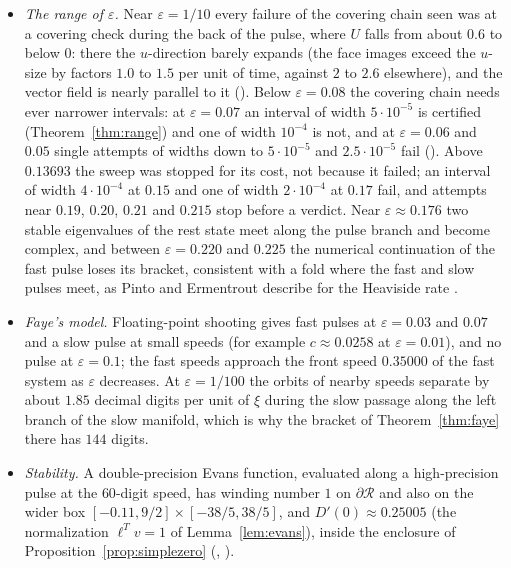 \documentclass[11pt]{article}
\theoremstyle{definition}
\newcommand{\eps}{\varepsilon}
\newcommand{\Rbox}{\mathcal{R}}
\begin{document}
\begin{itemize}
\item \emph{The range of $\eps$.} Near $\eps = 1/10$ every failure of the covering chain seen was at a covering check during the back of the pulse, where $U$ falls from about $0.6$ to below $0$: there the $u$-direction barely expands (the face images exceed the $u$-size by factors $1.0$ to $1.5$ per unit of time, against $2$ to $2.6$ elsewhere), and the vector field is nearly parallel to it (). Below $\eps = 0.08$ the covering chain needs ever narrower intervals: at $\eps = 0.07$ an interval of width $5\cdot 10^{-5}$ is certified (Theorem~\ref{thm:range}) and one of width $10^{-4}$ is not, and at $\eps = 0.06$ and $0.05$ single attempts of widths down to $5\cdot 10^{-5}$ and $2.5\cdot 10^{-5}$ fail (). Above $0.13693$ the sweep was stopped for its cost, not because it failed; an interval of width $4\cdot 10^{-4}$ at $0.15$ and one of width $2\cdot 10^{-4}$ at $0.17$ fail, and attempts near $0.19$, $0.20$, $0.21$ and $0.215$ stop before a verdict. Near $\eps \approx 0.176$ two stable eigenvalues of the rest state meet along the pulse branch and become complex, and between $\eps = 0.220$ and $0.225$ the numerical continuation of the fast pulse loses its bracket, consistent with a fold where the fast and slow pulses meet, as Pinto and Ermentrout describe for the Heaviside rate \cite[Fig.~7]{pe2001}.
\item \emph{Faye's model.} Floating-point shooting gives fast pulses at $\eps = 0.03$ and $0.07$ and a slow pulse at small speeds (for example $c \approx 0.0258$ at $\eps = 0.01$), and no pulse at $\eps = 0.1$; the fast speeds approach the front speed $0.35000$ of the fast system as $\eps$ decreases. At $\eps = 1/100$ the orbits of nearby speeds separate by about $1.85$ decimal digits per unit of $\xi$ during the slow passage along the left branch of the slow manifold, which is why the bracket of Theorem~\ref{thm:faye} there has $144$ digits.
\item \emph{Stability.} A double-precision Evans function, evaluated along a high-precision pulse at the $60$-digit speed, has winding number $1$ on $\partial\Rbox$ and also on the wider box $[-0.11, 9/2] \times [-38/5, 38/5]$, and $D'(0) \approx 0.25005$ (the normalization $\ell^Tv = 1$ of Lemma~\ref{lem:evans}), inside the enclosure of Proposition~\ref{prop:simplezero} (, ).

\end{itemize}
\end{document}

